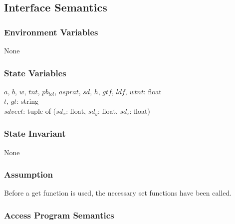 \documentclass[12pt]{article}
\begin{document}
\subsection{Interface Semantics}

\subsubsection{Environment Variables} 

None

\subsubsection{State Variables} \label{SecSVparams}

$a$, $b$, $w$, $tnt$, $pb_{tol}$, $asprat$, $sd$, $h$, $gtf$, $ldf$, $wtnt$: float \\
$t$, $gt$: string \\
$sdvect$: tuple of ($sd_{x}$: float, $sd_{y}$: float, $sd_{z}$: float)

\subsubsection{State Invariant}

None

\subsubsection{Assumption}

Before a get function is used, the necessary set functions have been called.

\subsubsection{Access Program Semantics}
\end{document}
